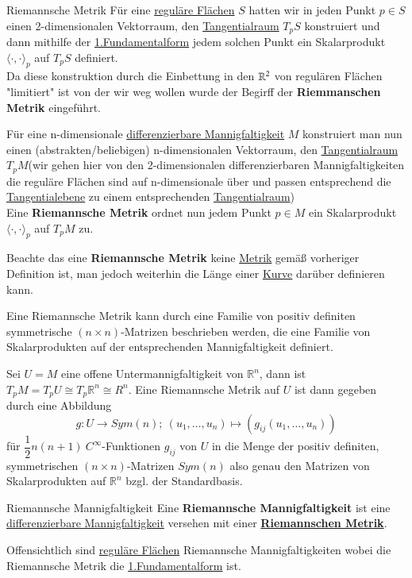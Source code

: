 \begin{titleDef}{Riemannsche Metrik}
\label{riemannMetrik}
Für eine \hyperref[regFlaeche]{reguläre Flächen} $S$ hatten wir in jeden Punkt $p\in S$ einen 2-dimensionalen Vektorraum, den \hyperref[tangentialebene]{Tangentialraum} $T_pS$ konstruiert und dann mithilfe der \hyperref[fundamentalformEins]{1.Fundamentalform} jedem solchen Punkt ein Skalarprodukt $\langle \cdot,\cdot\rangle_p$ auf $T_pS$ definiert.\\
Da diese konstruktion durch die Einbettung in den $\mathbb{R}^2$ von regulären Flächen "limitiert" ist von der wir weg wollen wurde der Begirff der \textbf{Riemmanschen Metrik} eingeführt.\par
Für eine n-dimensionale \hyperref[diffMannigfaltigkeit]{differenzierbare Mannigfaltigkeit} $M$ konstruiert man nun einen (abstrakten/beliebigen) n-dimensionalen Vektorraum, den \hyperref[tangentialraum]{Tangentialraum} $T_pM$(wir gehen hier von den 2-dimensionalen differenzierbaren Mannigfaltigkeiten die reguläre Flächen sind auf n-dimensionale über und passen entsprechend die \hyperref[tangentialebene]{Tangentialebene} zu einem entsprechenden \hyperref[tangentialraum]{Tangentialraum})\\
Eine \textbf{Riemannsche Metrik} ordnet nun jedem Punkt $p\in M$ ein Skalarprodukt $\langle \cdot,\cdot\rangle_p$ auf $T_pM$ zu.\par
Beachte das eine \textbf{Riemannsche Metrik} keine \hyperref[Metrik]{Metrik} gemäß vorheriger Definition ist, man jedoch weiterhin die Länge einer \hyperref[kurve]{Kurve} darüber definieren kann. \par
Eine Riemannsche Metrik kann durch eine Familie von positiv definiten symmetrische $(n\times n)$-Matrizen beschrieben werden, die eine Familie von Skalarprodukten auf der entsprechenden Mannigfaltigkeit definiert.\par
Sei $U=M$ eine offene Untermannigfaltigkeit von $\mathbb{R}^n$, dann ist $T_pM=T_pU\cong T_p\mathbb{R}^n\cong R^n$. Eine Riemannsche Metrik auf $U$ ist dann gegeben durch eine Abbildung 
$$g:U\to Sym(n);\: (u_1,\ldots,u_n)\mapsto(g_{ij}(u_1,\ldots,u_n))$$
für $\dfrac{1}{2}n(n+1)\: C^\infty$-Funktionen $g_{ij}$ von $U$ in die Menge der positiv definiten, symmetrischen $(n\times n)$-Matrizen $Sym(n)$ also genau den Matrizen von Skalarprodukten auf $\mathbb{R}^n$ bzgl. der Standardbasis.
\end{titleDef}

\begin{titleDef}{Riemannsche Mannigfaltigkeit}
\label{riemannMannigfaltigkeit}
Eine \textbf{Riemannsche Mannigfaltigkeit} ist eine \hyperref[diffMannigfaltigkeit]{differenzierbare Mannigfaltigkeit} versehen mit einer \hyperref[riemannMetrik]{\textbf{Riemannschen Metrik}}.\par
Offensichtlich sind \hyperref[regFlaeche]{reguläre Flächen} Riemannsche Mannigfaltigkeiten wobei die Riemannsche Metrik die \hyperref[fundamentalformEins]{1.Fundamentalform} ist.
\end{titleDef}

